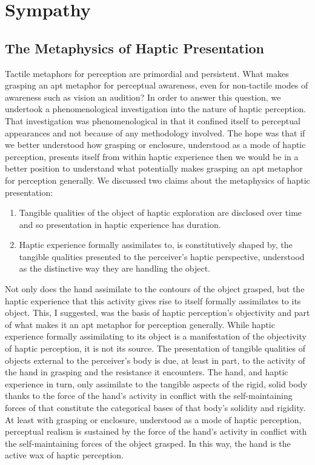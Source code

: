 \chapter{Sympathy} %
\label{cha:sympathy}

\section{The Metaphysics of Haptic Presentation} %
\label{sec:the_metaphysics_of_haptic_presentation}

Tactile metaphors for perception are primordial and persistent. What makes grasping an apt metaphor for perceptual awareness, even for non-tactile modes of awareness such as vision an audition? In order to answer this question, we undertook a phenomenological investigation into the nature of haptic perception. That investigation was phenomenological in that it confined itself to perceptual appearances and not because of any methodology involved. The hope was that if we better understood how grasping or enclosure, understood as a mode of haptic perception, presents itself from within haptic experience then we would be in a better position to understand what potentially makes grasping an apt metaphor for perception generally. We discussed two claims about the metaphysics of haptic presentation:
\begin{enumerate}
	\item Tangible qualities of the object of haptic exploration are disclosed over time and so presentation in haptic experience has duration.
	\item Haptic experience formally assimilates to, is constitutively shaped by, the tangible qualities presented to the perceiver's haptic perspective, understood as the distinctive way they are handling the object.
\end{enumerate}
Not only does the hand assimilate to the contours of the object grasped, but the haptic experience that this activity gives rise to itself formally assimilates to its object. This, I suggested, was the basis of haptic perception's objectivity and part of what makes it an apt metaphor for perception generally. While haptic experience formally assimilating to its object is a manifestation of the objectivity of haptic perception, it is not its source. The presentation of tangible qualities of objects external to the perceiver’s body is due, at least in part, to the activity of the hand in grasping and the resistance it encounters. The hand, and haptic experience in turn, only assimilate to the tangible aspects of the rigid, solid body thanks to the force of the hand’s activity in conflict with the self-maintaining forces of that constitute the categorical bases of that body’s solidity and rigidity. At least with grasping or enclosure, understood as a mode of haptic perception, perceptual realism is sustained by the force of the hand’s activity in conflict with the self-maintaining forces of the object grasped. In this way, the hand is the active wax of haptic perception.

